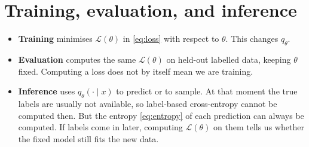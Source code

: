 \documentclass[12pt]{article}
\begin{document}
\section*{Training, evaluation, and inference}

\begin{itemize}
  \item \textbf{Training} minimises $\mathcal{L}(\theta)$ in
    \eqref{eq:loss} with respect to $\theta$. This changes $q_\theta$.
  \item \textbf{Evaluation} computes the same $\mathcal{L}(\theta)$ on
    held-out labelled data, keeping $\theta$ fixed. Computing a loss
    does not by itself mean we are training.
  \item \textbf{Inference} uses $q_\theta(\cdot \mid x)$ to predict or
    to sample. At that moment the true labels are usually not
    available, so label-based cross-entropy cannot be computed then.
    But the entropy \eqref{eq:entropy} of each prediction can always be
    computed. If labels come in later, computing $\mathcal{L}(\theta)$
    on them tells us whether the fixed model still fits the new data.
\end{itemize}
\end{document}
